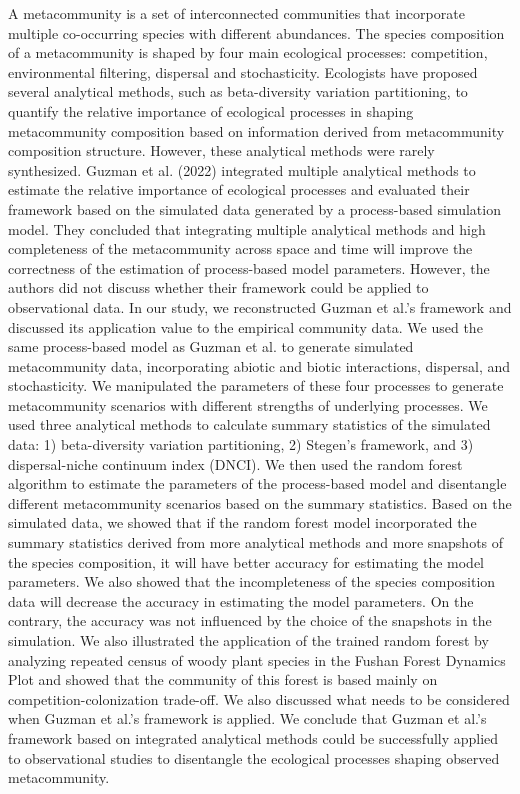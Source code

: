 \begin{abstract*}
\noindent
A metacommunity is a set of interconnected communities that incorporate multiple co-occurring species with different abundances. The species composition of a metacommunity is shaped by four main ecological processes: competition, environmental filtering, dispersal and stochasticity. Ecologists have proposed several analytical methods, such as beta-diversity variation partitioning, to quantify the relative importance of ecological processes in shaping metacommunity composition based on information derived from metacommunity composition structure. However, these analytical methods were rarely synthesized. Guzman et al. (2022) integrated multiple analytical methods to estimate the relative importance of ecological processes and evaluated their framework based on the simulated data generated by a process-based simulation model. They concluded that integrating multiple analytical methods and high completeness of the metacommunity across space and time will improve the correctness of the estimation of process-based model parameters. However, the authors did not discuss whether their framework could be applied to observational data. In our study, we reconstructed Guzman et al.'s framework and discussed its application value to the empirical community data. We used the same process-based model as Guzman et al. to generate simulated metacommunity data, incorporating abiotic and biotic interactions, dispersal, and stochasticity. We manipulated the parameters of these four processes to generate metacommunity scenarios with different strengths of underlying processes. We used three analytical methods to calculate summary statistics of the simulated data: 1) beta-diversity variation partitioning, 2) Stegen's framework, and 3) dispersal-niche continuum index (DNCI). We then used the random forest algorithm to estimate the parameters of the process-based model and disentangle different metacommunity scenarios based on the summary statistics. Based on the simulated data, we showed that if the random forest model incorporated the summary statistics derived from more analytical methods and more snapshots of the species composition, it will have better accuracy for estimating the model parameters. We also showed that the incompleteness of the species composition data will decrease the accuracy in estimating the model parameters. On the contrary, the accuracy was not influenced by the choice of the snapshots in the simulation. We also illustrated the application of the trained random forest by analyzing repeated census of woody plant species in the Fushan Forest Dynamics Plot and showed that the community of this forest is based mainly on competition-colonization trade-off. We also discussed what needs to be considered when Guzman et al.'s framework is applied. We conclude that Guzman et al.'s framework based on integrated analytical methods could be successfully applied to observational studies to disentangle the ecological processes shaping observed metacommunity.

\end{abstract*}